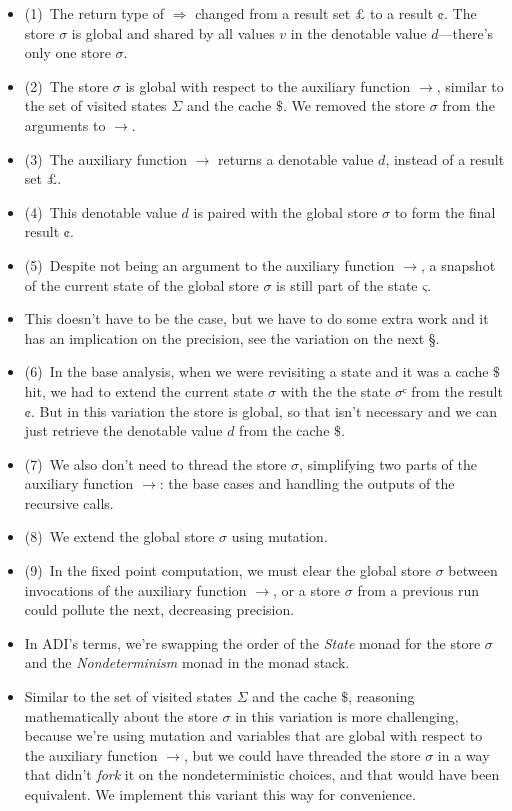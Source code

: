 \documentclass[12pt, oneside]{book}
\begin{document}
\begin{itemize}
  \item (1)~The return type of \(⇒\) changed from a result set \(£\) to a result \(¢\). The store \(σ\) is global and shared by all values \(v\) in the denotable value \(d\)—there’s only one store \(σ\).
  \item (2)~The store \(σ\) is global with respect to the auxiliary function \(→\), similar to the set of visited states \(Σ\) and the cache \(\$\). We removed the store \(σ\) from the arguments to \(→\).
  \item (3)~The auxiliary function \(→\) returns a denotable value \(d\), instead of a result set \(£\).
  \item (4)~This denotable value \(d\) is paired with the global store \(σ\) to form the final result \(¢\).
  \item (5)~Despite not being an argument to the auxiliary function \(→\), a snapshot of the current state of the global store \(σ\) is still part of the state \(ς\).
  \item This doesn’t have to be the case, but we have to do some extra work and it has an implication on the precision, see the variation on the next §.
  \item (6)~In the base analysis, when we were revisiting a state and it was a cache \(\$\) hit, we had to extend the current state \(σ\) with the the state \(σᶜ\) from the result \(¢\). But in this variation the store is global, so that isn’t necessary and we can just retrieve the denotable value \(d\) from the cache \(\$\).
  \item (7)~We also don’t need to thread the store \(σ\), simplifying two parts of the auxiliary function \(→\): the base cases and handling the outputs of the recursive calls.
  \item (8)~We extend the global store \(σ\) using mutation.
  \item (9)~In the fixed point computation, we must clear the global store \(σ\) between invocations of the auxiliary function \(→\), or a store \(σ\) from a previous run could pollute the next, decreasing precision.
  \item In ADI’s terms, we’re swapping the order of the \emph{State} monad for the store \(σ\) and the \emph{Nondeterminism} monad in the monad stack.
  \item Similar to the set of visited states \(Σ\) and the cache \(\$\), reasoning mathematically about the store \(σ\) in this variation is more challenging, because we’re using mutation and variables that are global with respect to the auxiliary function \(→\), but we could have threaded the store \(σ\) in a way that didn’t \emph{fork} it on the nondeterministic choices, and that would have been equivalent. We implement this variant this way for convenience.
\end{itemize}
\end{document}
